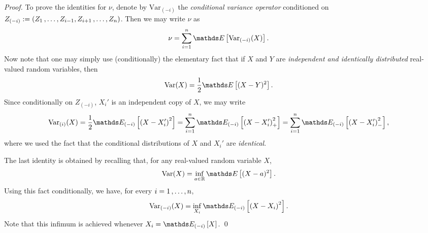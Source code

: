 \documentclass[11pt]{article}
\begin{document}
\begin{itemize}
\begin{proof}
To prove the identities for $\nu$, denote by $\text{Var}_{(-i)}$ the \emph{conditional variance operator} conditioned on $Z_{(-i)} := (Z_1 \,{,}\ldots{,}\, Z_{i-1}, Z_{i+1} \,{,}\ldots{,}\, Z_n)$. Then we may write $\nu$ as
\begin{align*}
\nu &= \sum_{i=1}^{n}\E{}{\text{Var}_{(-i)}(X)}.
\end{align*}
Now note that one may simply use (conditionally) the elementary fact that if $X$ and $Y$ are \emph{independent and identically distributed} real-valued random variables, then
\begin{align*}
\text{Var}(X) &= \frac{1}{2}\E{}{(X - Y )^2}.
\end{align*}
Since conditionally on $Z_{(-i)}$,  $X_i'$ is an independent copy of $X$, we may write
\begin{align*}
\text{Var}_{(i)}(X) &= \frac{1}{2}\E{(-i)}{\paren{X -  X_i'}^2 } = \sum_{i=1}^{n}\E{(-i)}{\paren{X -  X_i'}_{+}^2 } = \sum_{i=1}^{n}\E{(-i)}{\paren{X -  X_i'}_{-}^2 },
\end{align*}
where we used the fact that the conditional distributions of $X$ and $X_i'$ are \emph{identical}. 

The last identity is obtained by recalling that, for any real-valued random variable $X$, 
\begin{align*}
\text{Var}(X) &= \inf_{a \in \bR}\E{}{(X -a)^2}.
\end{align*}
Using this fact conditionally, we have, for every $i = 1 \,{,}\ldots{,}\, n$,
\begin{align*}
\text{Var}_{(-i)}(X) &= \inf_{X_i} \E{(-i)}{\paren{X -  X_i}^2 }.
\end{align*}
Note that this infimum is achieved whenever $X_i = \E{(-i)}{X}$. \qed
\end{proof}

\end{itemize}
\end{document}
